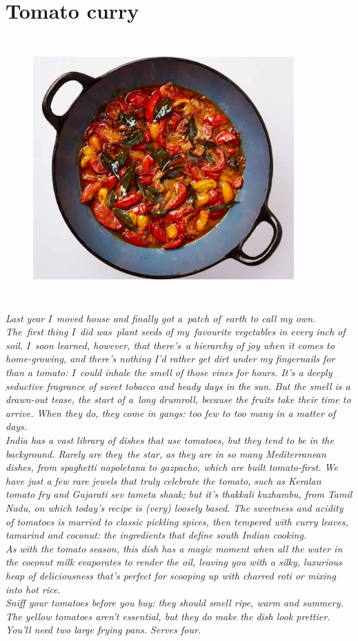\documentclass{book}
\begin{document}
\section{Tomato curry}
\begin{figure}
\centering\includegraphics[width=10cm,height=10cm,keepaspectratio]{Recipe_Pictures/Tomato_curry.png}
\end{figure}
\emph{Last year I moved house and finally got a patch of earth to call my own. The first thing I did was plant seeds of my favourite vegetables in every inch of soil. I soon learned, however, that there’s a hierarchy of joy when it comes to home-growing, and there’s nothing I’d rather get dirt under my fingernails for than a tomato: I could inhale the smell of those vines for hours. It’s a deeply seductive fragrance of sweet tobacco and heady days in the sun. But the smell is a drawn-out tease, the start of a long drumroll, because the fruits take their time to arrive. When they do, they come in gangs: too few to too many in a matter of days.\\ 
India has a vast library of dishes that use tomatoes, but they tend to be in the background. Rarely are they the star, as they are in so many Mediterranean dishes, from spaghetti napoletana to gazpacho, which are built tomato-first. We have just a few rare jewels that truly celebrate the tomato, such as Keralan tomato fry and Gujarati sev tameta shaak; but it’s thakkali kuzhambu, from Tamil Nadu, on which today’s recipe is (very) loosely based. The sweetness and acidity of tomatoes is married to classic pickling spices, then tempered with curry leaves, tamarind and coconut: the ingredients that define south Indian cooking.\\ 
As with the tomato season, this dish has a magic moment when all the water in the coconut milk evaporates to render the oil, leaving you with a silky, luxurious heap of deliciousness that’s perfect for scooping up with charred roti or mixing into hot rice.\\ 
Sniff your tomatoes before you buy: they should smell ripe, warm and summery. The yellow tomatoes aren’t essential, but they do make the dish look prettier. You’ll need two large frying pans. Serves four.}\\\\ 
\end{document}
